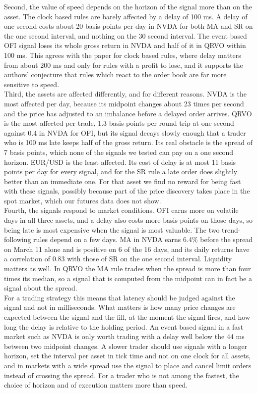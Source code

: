 \documentclass{article}
\begin{document}
\noindent Second, the value of speed depends on the horizon of the signal more than on the asset. The clock based rules are barely affected by a delay of 100 ms. A delay of one second costs about 20 basis points per day in NVDA for both MA and SR on the one second interval, and nothing on the 30 second interval. The event based OFI signal loses its whole gross return in NVDA and half of it in QRVO within 100 ms. This agrees with the paper for clock based rules, where delay matters from about 200 ms and only for rules with a profit to lose, and it supports the authors' conjecture that rules which react to the order book are far more sensitive to speed.\\

\noindent Third, the assets are affected differently, and for different reasons. NVDA is the most affected per day, because its midpoint changes about 23 times per second and the price has adjusted to an imbalance before a delayed order arrives. QRVO is the most affected per trade, 1.3 basis points per round trip at one second against 0.4 in NVDA for OFI, but its signal decays slowly enough that a trader who is 100 ms late keeps half of the gross return. Its real obstacle is the spread of 7 basis points, which none of the signals we tested can pay on a one second horizon. EUR/USD is the least affected. Its cost of delay is at most 11 basis points per day for every signal, and for the SR rule a late order does slightly better than an immediate one. For that asset we find no reward for being fast with these signals, possibly because part of the price discovery takes place in the spot market, which our futures data does not show.\\

\noindent Fourth, the signals respond to market conditions. OFI earns more on volatile days in all three assets, and a delay also costs more basis points on those days, so being late is most expensive when the signal is most valuable. The two trend-following rules depend on a few days. MA in NVDA earns 6.4\% before the spread on March 11 alone and is positive on 6 of the 16 days, and its daily returns have a correlation of 0.83 with those of SR on the one second interval. Liquidity matters as well. In QRVO the MA rule trades when the spread is more than four times its median, so a signal that is computed from the midpoint can in fact be a signal about the spread.\\

\noindent For a trading strategy this means that latency should be judged against the signal and not in milliseconds. What matters is how many price changes are expected between the signal and the fill, at the moment the signal fires, and how long the delay is relative to the holding period. An event based signal in a fast market such as NVDA is only worth trading with a delay well below the 44 ms between two midpoint changes. A slower trader should use signals with a longer horizon, set the interval per asset in tick time and not on one clock for all assets, and in markets with a wide spread use the signal to place and cancel limit orders instead of crossing the spread. For a trader who is not among the fastest, the choice of horizon and of execution matters more than speed.\\
\end{document}
